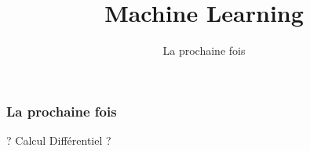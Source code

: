 \documentclass{formation}
\title{Machine Learning}
\subtitle{La prochaine fois}
\begin{document}
\maketitle

\begin{frame}
  \frametitle{La prochaine fois}
  \begin{center}? Calcul Différentiel ?\end{center}
\end{frame}
\end{document}
